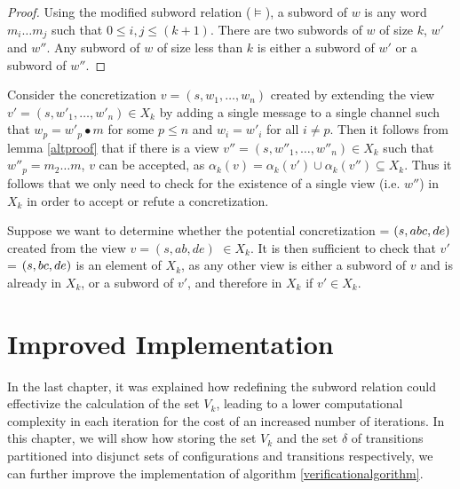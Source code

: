 \begin{proof}
Using the modified subword relation ($\models$), a subword of $w$ is any word $m_i\ldots m_j$ such that $0 \leq i,j \leq (k+1)$. There are two subwords of $w$ of size $k$, $w'$ and $w''$. Any subword of $w$ of size less than $k$ is either a subword of $w'$ or a subword of $w''$.
\end{proof}

Consider the concretization $v = (s, w_1, \ldots, w_n)$ created by extending the view $v' = (s, w'_1, \ldots, w'_n) \in X_k$ by adding a single message to a single channel such that $w_p = w'_p \bullet m$ for some $p\leq n$ and $w_i = w'_i$ for all $i \neq p$. Then it follows from lemma \ref{altproof} that if there is a view $v'' = (s, w''_1, \ldots, w''_n) \in X_k$ such that $w''_p = m_2\ldots m$, $v$ can be accepted, as $\alpha_k(v) = \alpha_k(v') \cup \alpha_k(v'') \subseteq X_k$. Thus it follows that we only need to check for the existence of a single view (i.e. $w''$) in $X_k$ in order to accept or refute a concretization.




\begin{exmp}
Suppose we want to determine whether the potential concretization  = $(s, abc, de)$ created from the view $v = (s, ab, de)$ $\in X_k$. It is then sufficient to check that $v'$ = $(s,bc,de)$ is an element of $X_k$, as any other view is either a subword of $v$ and is already in $X_k$, or a subword of $v'$, and therefore in $X_k$ if $v' \in X_k$.
\end{exmp}
\newpage
\newpage
\section{Improved Implementation}
In the last chapter, it was explained how redefining the subword relation could effectivize the calculation of the set $V_k$, leading to a lower computational complexity in each iteration for the cost of an increased number of iterations. In this chapter, we will show how storing the set $V_k$ and the set $\delta$ of transitions partitioned into disjunct sets of configurations and transitions respectively, we can further improve the implementation of algorithm \ref{verificationalgorithm}.

